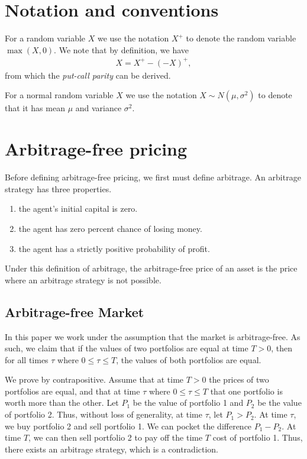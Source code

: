 \documentclass[reqno]{amsart}
\begin{document}
\appendix

\section{Notation and conventions}

For a random variable $X$ we use the notation $X^+$ to denote the random variable $\max(X,0)$. We note that by definition, we have 
\begin{align}\label{eq: pos part decomp}
      X = X^+ - (-X)^+,
\end{align}
from which the \emph{put-call parity} can be derived. 

For a normal random variable $X$ we use the notation $X \sim N(\mu,\sigma^2)$
to denote that it has mean $\mu$ and variance $\sigma^2$.

\section{Arbitrage-free pricing} \label{Arbitrage-Free Pricing Appendix}

Before defining arbitrage-free pricing, we first must define arbitrage. An arbitrage strategy has three properties. 
\begin{enumerate}
     \item the agent's initial capital is zero.
     \item the agent has zero percent chance of losing money.
     \item the agent has a strictly positive probability of profit. 
\end{enumerate}
Under this definition of arbitrage, the arbitrage-free price of an asset is the price where an arbitrage strategy is not possible.

\subsection{Arbitrage-free Market}

In this paper we work under the assumption that the market is arbitrage-free. As such, we claim that if the values of two portfolios are equal at time $T > 0$, then for all times $\tau$ where $0 \leq \tau \leq T$, the values of both portfolios are equal.

We prove by contrapositive. Assume that at time $T > 0$ the prices of two portfolios are equal, and that at time $\tau$ where $0 \leq \tau \leq T$ that one portfolio is worth more than the other. 
Let $P_1$ be the value of portfolio 1 and $P_2$ be the value of portfolio 2. Thus, without loss of generality, at time $\tau$, let $P_1 > P_2$.
At time $\tau$, we buy portfolio 2 and sell portfolio 1. We can pocket the difference $P_1 - P_2$. At time $T$, we can then sell portfolio 2 to pay off the time $T$ cost of portfolio 1. 
Thus, there exists an arbitrage strategy, which is a contradiction.
\end{document}
